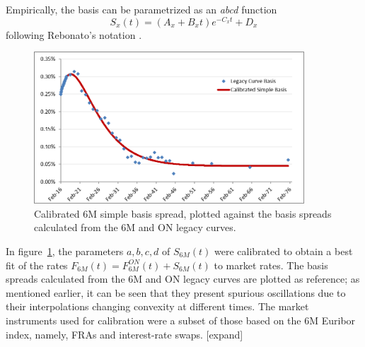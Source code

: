 \documentclass{article}
\begin{document}
Empirically, the basis can be parametrized as an \textit{abcd} function
\begin{equation}
\label{ABCD}
S_x(t) = (A_x + B_x t)e^{-C_x t} + D_x
\end{equation}
following Rebonato's notation \cite{rebonato}.

\begin{figure}[!ht]
\centering
\includegraphics[width=0.9\textwidth]{Empirical6MBasis.png}
\caption{Calibrated 6M simple basis spread, plotted against the basis spreads calculated from the 6M and ON legacy curves.}
\label{Empirical6MBasis}
\end{figure}

In figure~\ref{Empirical6MBasis}, the parameters $a,b,c,d$ of $S_{6M}(t)$ were calibrated to obtain a best fit of the rates $F_{6M}(t) = F_{6M}^{ON}(t) + S_{6M}(t)$ to market rates. The basis spreads calculated from the 6M and ON legacy curves are plotted as reference; as mentioned earlier, it can be seen that they present spurious oscillations due to their interpolations changing convexity at different times. The market instruments used for calibration were a subset of those based on the 6M Euribor index, namely, FRAs and interest-rate swaps. [expand]
\end{document}
